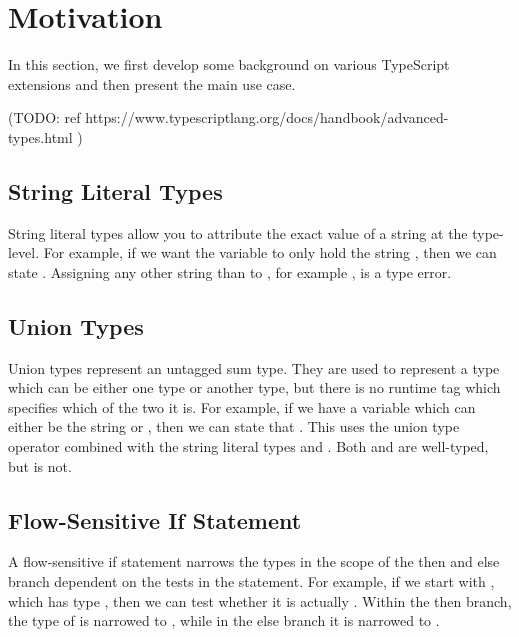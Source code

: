 \section{Motivation}
\label{sec:motivation}

In this section, we first develop some background on various TypeScript extensions and then present the main use case.

(TODO: ref https://www.typescriptlang.org/docs/handbook/advanced-types.html )

\subsection{String Literal Types}

String literal types allow you to attribute the exact value of a string at the type-level. For example, if we want the variable  to only hold the string , then we can state . Assigning any other string than  to , for example , is a type error.

\subsection{Union Types}

Union types represent an untagged sum type. They are used to represent a type which can be either one type or another type, but there is no runtime tag which specifies which of the two it is. For example, if we have a variable which can either be the string  or , then we can state that . This uses the union type operator \ts{|} combined with the string literal types  and . Both  and  are well-typed, but  is not.

\subsection{Flow-Sensitive If Statement}

A flow-sensitive if statement narrows the types in the scope of the then and else branch dependent on the tests in the statement. For example, if we start with , which has type , then we can test whether it is actually . Within the then branch, the type of  is narrowed to , while in the else branch it is narrowed to .

